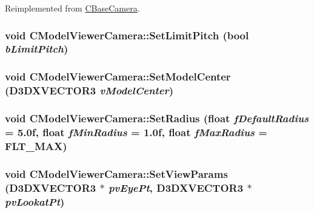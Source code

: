 Reimplemented from \hyperlink{class_c_base_camera_a8c425184f1114f17bb8e1b3505c13036}{CBaseCamera}.\hypertarget{class_c_model_viewer_camera_adccbf68ed56b3d7204366dd8702912b4}{
\subsubsection[{SetLimitPitch}]{\setlength{\rightskip}{0pt plus 5cm}void CModelViewerCamera::SetLimitPitch (bool {\em bLimitPitch})}}
\label{class_c_model_viewer_camera_adccbf68ed56b3d7204366dd8702912b4}
\hypertarget{class_c_model_viewer_camera_ae1511eb18ef5ec36904ba2f6819e26f2}{
\subsubsection[{SetModelCenter}]{\setlength{\rightskip}{0pt plus 5cm}void CModelViewerCamera::SetModelCenter (D3DXVECTOR3 {\em vModelCenter})}}
\label{class_c_model_viewer_camera_ae1511eb18ef5ec36904ba2f6819e26f2}
\hypertarget{class_c_model_viewer_camera_ae86762ee234412b6a0947b791d7be2d3}{
\subsubsection[{SetRadius}]{\setlength{\rightskip}{0pt plus 5cm}void CModelViewerCamera::SetRadius (float {\em fDefaultRadius} = {\ttfamily 5.0f}, \/  float {\em fMinRadius} = {\ttfamily 1.0f}, \/  float {\em fMaxRadius} = {\ttfamily FLT\_\-MAX})}}
\label{class_c_model_viewer_camera_ae86762ee234412b6a0947b791d7be2d3}
\hypertarget{class_c_model_viewer_camera_a3cfc3e0fd350457b4206054c96fc39f7}{
\subsubsection[{SetViewParams}]{\setlength{\rightskip}{0pt plus 5cm}void CModelViewerCamera::SetViewParams (D3DXVECTOR3 $\ast$ {\em pvEyePt}, \/  D3DXVECTOR3 $\ast$ {\em pvLookatPt})}}
\label{class_c_model_viewer_camera_a3cfc3e0fd350457b4206054c96fc39f7}


